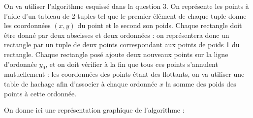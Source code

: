 \Q
On va utiliser l'algorithme esquissé dans la question 3. On représente les points à l'aide d'un tableau de 2-tuples tel que le premier élément de chaque tuple donne les coordonnées $(x,y)$ du point et le second son poids. Chaque rectangle doit être donné par deux abscisses et deux ordonnées : on représentera donc un rectangle par un tuple de deux points correspondant aux points de poids 1 du rectangle. Chaque rectangle posé ajoute deux nouveaux points sur la ligne d'ordonnée $y_0$, et on doit vérifier à la fin que tous ces points s'annulent mutuellement : les coordonnées des points étant des flottants, on va utiliser une table de hachage afin d'associer à chaque ordonnée $x$ la somme des poids des points à cette ordonnée.



On donne ici une représentation graphique de l'algorithme :

